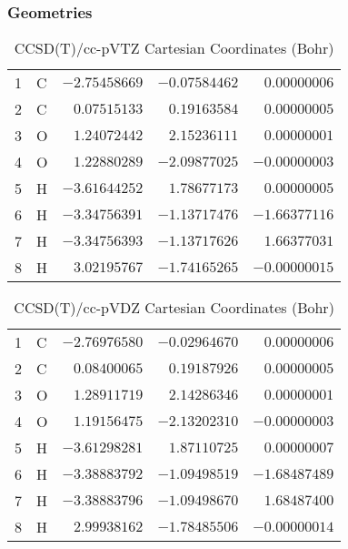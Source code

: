 \documentclass[10pt,oneside]{article}
\begin{document}
\subsubsection*{Geometries}
\begin{table}[h!]
\centering
\caption{CCSD(T)/cc-pVTZ Cartesian Coordinates (Bohr)}
\begin{tabular}{llrrr}
1  & C  & $-2.75458669$ & $-0.07584462$ & $ 0.00000006$ \\
2  & C  & $ 0.07515133$ & $ 0.19163584$ & $ 0.00000005$ \\
3  & O  & $ 1.24072442$ & $ 2.15236111$ & $ 0.00000001$ \\
4  & O  & $ 1.22880289$ & $-2.09877025$ & $-0.00000003$ \\
5  & H  & $-3.61644252$ & $ 1.78677173$ & $ 0.00000005$ \\
6  & H  & $-3.34756391$ & $-1.13717476$ & $-1.66377116$ \\
7  & H  & $-3.34756393$ & $-1.13717626$ & $ 1.66377031$ \\
8  & H  & $ 3.02195767$ & $-1.74165265$ & $-0.00000015$ \\
\end{tabular}
\end{table}

\begin{table}[h!]
\centering
\caption{CCSD(T)/cc-pVDZ Cartesian Coordinates (Bohr)}
\begin{tabular}{llrrr}
1  & C  & $-2.76976580$ & $-0.02964670$ & $ 0.00000006$ \\
2  & C  & $ 0.08400065$ & $ 0.19187926$ & $ 0.00000005$ \\
3  & O  & $ 1.28911719$ & $ 2.14286346$ & $ 0.00000001$ \\
4  & O  & $ 1.19156475$ & $-2.13202310$ & $-0.00000003$ \\
5  & H  & $-3.61298281$ & $ 1.87110725$ & $ 0.00000007$ \\
6  & H  & $-3.38883792$ & $-1.09498519$ & $-1.68487489$ \\
7  & H  & $-3.38883796$ & $-1.09498670$ & $ 1.68487400$ \\
8  & H  & $ 2.99938162$ & $-1.78485506$ & $-0.00000014$ \\
\end{tabular}
\end{table}
\end{document}

